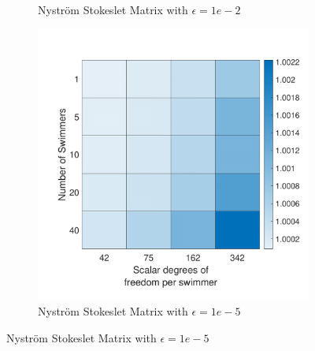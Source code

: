 \begin{figure}
\begin{subfigure}{0.3\textwidth}
        \caption{Nyström Stokeslet Matrix with $\epsilon=1e-2$}
    \end{subfigure}
    \begin{subfigure}{0.3\textwidth}
        \includegraphics[width=\linewidth]{Images/Condition/Stokeslet Matrix-5.pdf}
        \caption{Nyström Stokeslet Matrix with $\epsilon=1e-5$}
    \end{subfigure}
\end{figure}

